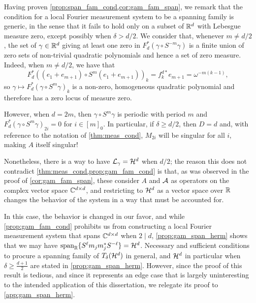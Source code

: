 Having proven \cref{prop:span_fam_cond,cor:gam_fam_span}, we remark that the condition for a local Fourier measurement system to be a spanning family is generic, in the sense that it fails to hold only on a subset of $\mathbb{R}^d$ with Lebesgue measure zero, except possibly when $\delta > d / 2$.  We consider that, whenever $m \neq d / 2$, the set of $\gamma \in \mathbb{R}^d$ giving at least one zero in $F_d^*(\gamma \circ S^{-m} \gamma)$ is a finite union of zero sets of non-trivial quadratic polynomials and hence a set of zero measure.  %
Indeed, when $m \neq d / 2$, we have that \[F_d^*((e_1 + e_{m + 1}) \circ S^m(e_1 + e_{m + 1}))_k = f_k^{d*} e_{m + 1} = \omega^{-m(k-1)},\] so $\gamma \mapsto F_d^*(\gamma \circ S^m \gamma)_k$ is a non-zero, homogeneous quadratic polynomial and therefore has a zero locus of measure zero.

However, when $d = 2 m$, then $\gamma \circ S^m \gamma$ is periodic with period $m$ and $F_d^*(\gamma \circ S^m \gamma)_{2i} = 0$ for $i \in [m]_0$.  In particular, if $\delta \ge d / 2$, then $D = d$ and, with reference to the notation of \cref{thm:meas_cond}, $M_{2i}$ will be singular for all $i$, making $A$ itself singular!  

Nonetheless, there is a way to have $\mathcal{L}_\gamma = \mathcal{H}^d$ when $d / 2$; the reason this does not contradict \cref{thm:meas_cond,prop:gam_fam_cond} is that, as was observed in the proof of \cref{cor:gam_fam_span}, these consider $A$ and $\mathcal{A}$ as operators on the complex vector space $\mathbb{C}^{d \times d}$, and restricting to $\mathcal{H}^d$ as a vector space over $\mathbb{R}$ changes the behavior of the system in a way that must be accounted for.  

In this case, the behavior is changed in our favor, and while \cref{prop:gam_fam_cond} prohibits us from constructing a local Fourier measurement system that spans $\mathbb{C}^{d \times d}$ when $2 \mid d$, \cref{prop:gam_span_herm} shows that we may have $\operatorname{span}_{\mathbb{R}} \{S^{\ell} m_j m_j^* S^{-\ell}\} = \mathcal{H}^d$.  Necessary and sufficient conditions to procure a spanning family of $T_\delta(\mathcal{H}^d)$ in general, and $\mathcal{H}^d$ in particular when $\delta \ge \frac{d + 1}{2}$ are stated in \cref{prop:gam_span_herm}.  However, since the proof of this result is tedious, and since it represents an edge case that is largely uninteresting to the intended application of this dissertation, we relegate its proof to \cref{app:gam_span_herm}.

